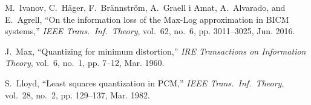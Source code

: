 \documentclass[journal]{IEEEtran}
\begin{document}
\begin{thebibliography}{10}
	M.~{Ivanov}, C.~{H{\"{a}}ger}, F.~{Br{\"{a}}nnstr{\"{o}}m}, A.~{Graell i Amat},
	A.~{Alvarado}, and E.~{Agrell}, ``On the information loss of the {Max-Log}
	approximation in {BICM} systems,'' \emph{IEEE Trans.\ Inf.\ Theory}, vol.~62,
	no.~6, pp. 3011--3025, Jun. 2016.
	
	J.~{Max}, ``Quantizing for minimum distortion,'' \emph{IRE Transactions on
		Information Theory}, vol.~6, no.~1, pp. 7--12, Mar. 1960.
	
	S.~{Lloyd}, ``Least squares quantization in {PCM},'' \emph{IEEE Trans.\ Inf.\
		Theory}, vol.~28, no.~2, pp. 129--137, Mar. 1982.
	
\end{thebibliography}
\end{document}
